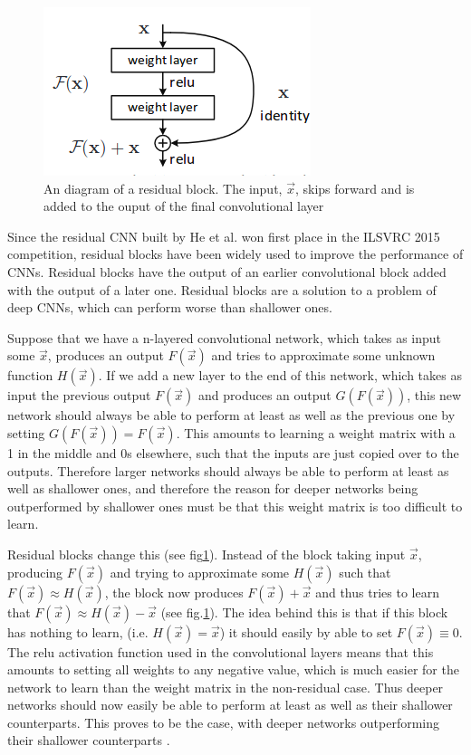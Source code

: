 
\begin{figure}[h!]
\centering
\includegraphics[scale=0.55]{pictures/residualBlock}
\caption{An diagram of a residual block. The input, $\vec{x}$, skips forward and is added to the ouput of the final convolutional layer \cite{ResNet}}
\label{fig:ResBlock}
\end{figure}

Since the residual CNN built by He et al. \cite{ResNet} won first place in the ILSVRC 2015 competition, residual blocks have been widely used to improve the performance of CNNs. Residual blocks have the output of an earlier convolutional block added with the output of a later one. Residual blocks are a solution to a problem of deep CNNs, which can perform worse than shallower ones. 

Suppose that we have a n-layered convolutional network, which takes as input some $\vec{x}$, produces an output $F(\vec{x})$ and tries to approximate some unknown function $H(\vec{x})$. If we add a new layer to the end of this network, which takes as input the previous output $F(\vec{x})$ and produces an output $G(F(\vec{x}))$, this new network should always be able to perform at least as well as the previous one by setting $G(F(\vec{x})) = F(\vec{x})$. This amounts to learning a weight matrix with a 1 in the middle and 0s elsewhere, such that the inputs are just copied over to the outputs. Therefore larger networks should always be able to perform at least as well as shallower ones, and therefore the reason for deeper networks being outperformed by shallower ones must be that this weight matrix is too difficult to learn. 

Residual blocks change this (see fig\ref{fig:ResBlock}). Instead of the block taking input $\vec{x}$, producing $F(\vec{x})$ and trying to approximate some $H(\vec{x})$ such that $F(\vec{x})\approx H(\vec{x})$, the block now produces $F(\vec{x}) + \vec{x}$ and thus tries to learn that $F(\vec{x}) \approx H(\vec{x}) - \vec{x}$ (see fig.\ref{fig:ResBlock}). The idea behind this is that if this block has nothing to learn, (i.e. $H(\vec{x}) = \vec{x}$) it should easily by able to set $F(\vec{x}) \equiv 0$. The relu activation function used in the convolutional layers means that this amounts to setting all weights to any negative value, which is much easier for the network to learn than the weight matrix in the non-residual case. Thus deeper networks should now easily be able to perform at least as well as their shallower counterparts. This proves to be the case, with deeper networks outperforming their shallower counterparts \cite{ResNet}.